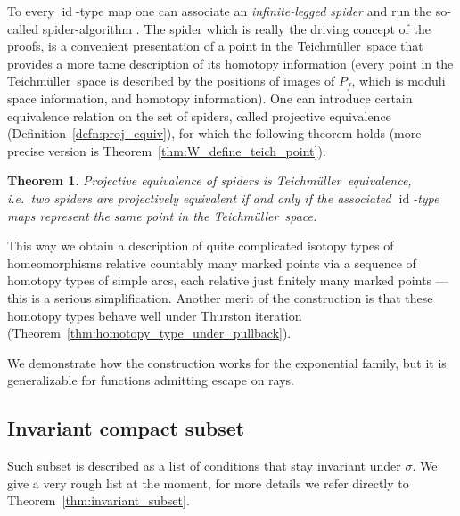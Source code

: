 \documentclass[10pt,reqno,a4paper]{amsart}
\numberwithin{figure}{section}
\numberwithin{equation}{section}
\newtheorem*{thmnonum}{Theorem}
\newcommand{\tei}{Teichm\"uller}
\newcommand{\id}{\operatorname{id}}
\begin{document}
To every $\id$-type map one can associate an \emph{infinite-legged spider} and run the so-called spider-algorithm \cite{Spiders,MarkusThesis}. The spider which is really the driving concept of the proofs, is a convenient presentation of a point in the \tei\ space that provides a more tame description of its homotopy information (every point in the \tei\ space is described by the positions of images of $P_f$, which is moduli space information, and homotopy information). One can introduce certain equivalence relation on the set of spiders, called projective equivalence (Definition~\ref{defn:proj_equiv}), for which the following theorem holds (more precise version is Theorem~\ref{thm:W_define_teich_point}).  

\begin{thmnonum}
	Projective equivalence of spiders is \tei\ equivalence, i.e.\ two spiders are projectively equivalent if and only if the associated $\id$-type maps represent the same point in the \tei\ space.
\end{thmnonum}

This way we obtain a description of quite complicated isotopy types of homeomorphisms relative countably many marked points via a sequence of homotopy types of simple arcs, each relative just finitely many marked points --- this is a serious simplification. Another merit of the construction is that these homotopy types behave well under Thurston iteration (Theorem~\ref{thm:homotopy_type_under_pullback}).

We demonstrate how the construction works for the exponential family, but it is generalizable for functions admitting escape on rays.

\subsection*{Invariant compact subset}

Such subset is described as a list of conditions that stay invariant under $\sigma$. We give a very rough list at the moment, for more details we refer directly to Theorem~\ref{thm:invariant_subset}.
\end{document}

